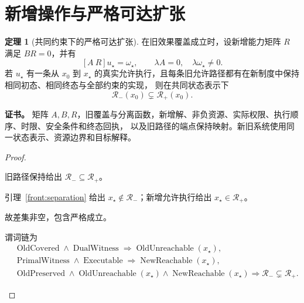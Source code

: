 \documentclass[UTF8,12pt,a4paper,openany,fontset=none,zihao=false]{ctexrep}
\theoremstyle{definition}
\newtheorem{theorem}{定理}[chapter]
\newenvironment{certificate}{\par\noindent\textbf{证书。}\ignorespaces}{\par}
\newcommand{\1}{\mathbf 1}
\begin{document}
\section{新增操作与严格可达扩张}

\begin{theorem}[共同约束下的严格可达扩张]
\label{front:strict}
在旧效果覆盖成立时，设新增能力矩阵 \(R\) 满足 \(BR=0\)，并有
\[
[A\ R]u_\star=\omega_\star,
\qquad
\lambda A=0,\quad\lambda\omega_\star\ne0.
\]
若 \(u_\star\) 有一条从 \(x_0\) 到 \(x_\star\) 的真实允许执行，且每条旧允许路径都有在新制度中保持相同初态、相同终态与全部约束的实现，
则在共同状态表示下
\[
\boxed{\mathcal R_-(x_0)\subsetneq\mathcal R_+(x_0).}
\]
\end{theorem}
\begin{certificate}
矩阵 \(A,B,R\)，旧覆盖与分离函数，新增解、非负资源、实际权限、执行顺序、时限、安全条件和终态回执，
以及旧路径的端点保持映射。新旧系统使用同一状态表示、资源边界和目标解释。
\end{certificate}
\begin{proof}
\begin{semanticsteps}
\item 旧路径保持给出 \(\mathcal R_-\subseteq\mathcal R_+\)。
\item 引理~\ref{front:separation} 给出
\(x_\star\notin\mathcal R_-\)；新增允许执行给出 \(x_\star\in\mathcal R_+\)。
\item 故差集非空，包含严格成立。
\item 谓词链为
\[
\begin{aligned}
&\operatorname{OldCovered}\land\operatorname{DualWitness}
\Longrightarrow\operatorname{OldUnreachable}(x_\star),\\
&\operatorname{PrimalWitness}\land\operatorname{Executable}
\Longrightarrow\operatorname{NewReachable}(x_\star),\\
&\operatorname{OldPreserved}\land\operatorname{OldUnreachable}(x_\star)
\land\operatorname{NewReachable}(x_\star)
\Longrightarrow\mathcal R_-\subsetneq\mathcal R_+.
\end{aligned}
\]
\end{semanticsteps}
\end{proof}
\end{document}
